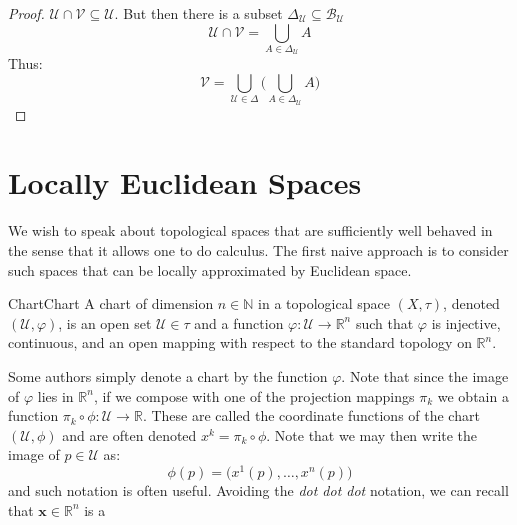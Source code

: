 \documentclass{article}                                                        %
\begin{document}
\begin{proof}
                $\mathcal{U}\cap\mathcal{V}\subseteq\mathcal{U}$. But then there
                is a subset
                $\Delta_{\mathcal{U}}\subseteq\mathscr{B}_{\mathcal{U}}$
                \begin{equation}
                    \mathcal{U}\cap\mathcal{V}=
                    \bigcup_{A\in\Delta_{\mathcal{U}}}A
                \end{equation}
                Thus:
                \begin{equation}
                    \mathcal{V}=\bigcup_{\mathcal{U}\in\Delta}\Big(
                        \bigcup_{A\in\Delta_{\mathcal{U}}}A\Big)
                \end{equation}
        \end{proof}
    \section{Locally Euclidean Spaces}
        We wish to speak about topological spaces that are sufficiently well
        behaved in the sense that it allows one to do calculus. The first
        naive approach is to consider such spaces that can be locally
        approximated by Euclidean space.
        \begin{fdefinition}{Chart}{Chart}
            A chart of dimension $n\in\mathbb{N}$ in a topological space
            $(X,\tau)$, denoted $(\mathcal{U},\varphi)$, is an open set
            $\mathcal{U}\in\tau$ and a function
            $\varphi:\mathcal{U}\rightarrow\mathbb{R}^{n}$ such that
            $\varphi$ is injective, continuous, and an open mapping with
            respect to the standard topology on $\mathbb{R}^{n}$.
        \end{fdefinition}
        Some authors simply denote a chart by the function $\varphi$. Note
        that since the image of $\varphi$ lies in $\mathbb{R}^{n}$, if we
        compose with one of the projection mappings $\pi_{k}$ we obtain a
        function $\pi_{k}\circ\phi:\mathcal{U}\rightarrow\mathbb{R}$. These
        are called the coordinate functions of the chart
        $(\mathcal{U},\phi)$ and are often denoted $x^{k}=\pi_{k}\circ\phi$.
        Note that we may then write the image of $p\in\mathcal{U}$ as:
        \begin{equation}
            \phi(p)=\big(x^{1}(p),\dots,x^{n}(p)\big)
        \end{equation}
        and such notation is often useful. Avoiding the \textit{dot dot dot}
        notation, we can recall that $\mathbf{x}\in\mathbb{R}^{n}$ is a
\end{document}

